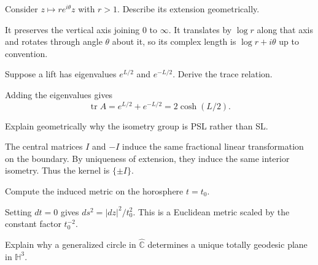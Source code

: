 \begin{problem}\label{prob:vii36-06}
Consider \(z\mapsto re^{i\theta}z\) with \(r>1\).  Describe its extension geometrically.
\end{problem}

\begin{solution}
It preserves the vertical axis joining \(0\) to \(\infty\).  It translates by \(\log r\) along that axis and rotates through angle \(\theta\) about it, so its complex length is \(\log r+i\theta\) up to convention.
\end{solution}

\begin{problem}\label{prob:vii36-07}
Suppose a lift has eigenvalues \(e^{L/2}\) and \(e^{-L/2}\).  Derive the trace relation.
\end{problem}

\begin{solution}
Adding the eigenvalues gives
\[
\operatorname{tr}A=e^{L/2}+e^{-L/2}=2\cosh(L/2).
\]
\end{solution}

\begin{problem}\label{prob:vii36-08}
Explain geometrically why the isometry group is PSL rather than SL.
\end{problem}

\begin{solution}
The central matrices \(I\) and \(-I\) induce the same fractional linear transformation on the boundary.  By uniqueness of extension, they induce the same interior isometry.  Thus the kernel is \(\{\pm I\}\).
\end{solution}

\begin{problem}\label{prob:vii36-09}
Compute the induced metric on the horosphere \(t=t_0\).
\end{problem}

\begin{solution}
Setting \(dt=0\) gives \(ds^2=|dz|^2/t_0^2\).  This is a Euclidean metric scaled by the constant factor \(t_0^{-2}\).
\end{solution}

\begin{problem}\label{prob:vii36-10}
Explain why a generalized circle in \(\widehat{\mathbb C}\) determines a unique totally geodesic plane in \(\mathbb H^3\).
\end{problem}

